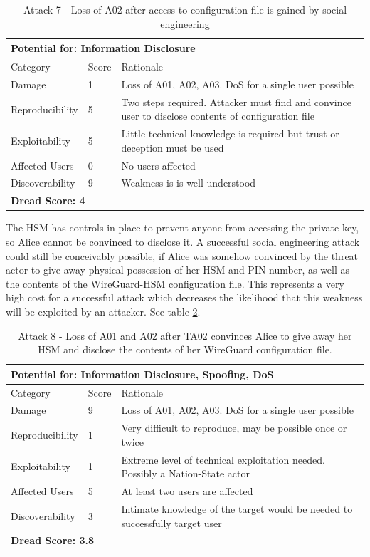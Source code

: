 \documentclass [11pt, proquest] {uwthesis}[2020/02/24]
\begin{document}
\begin{table}[H]
\label{attack7-hsm}
\begin{tabular}{|m{3cm}|m{.9cm}|p{27em} |}
\multicolumn{3}{l}{Potential for: Information Disclosure}                   \\
\hline
Category & Score & Rationale \\
\hline
Damage          & 1     & Loss of A01, A02, A03. DoS for a single user possible            \\
\hline
Reproducibility & 5     & Two steps required. Attacker must find and convince user to disclose contents of configuration file    \\
\hline
Exploitability & 5      & Little technical knowledge is required but trust or deception must be used   \\
\hline
Affected Users  & 0     &  No users affected                     \\
\hline
Discoverability & 9     & Weakness is is well understood  \\
\hline
\multicolumn{3}{l}{\textbf{Dread Score: 4}} 
\end{tabular}
\caption{Attack 7 - Loss of A02 after access to configuration file is gained by social engineering}
\end{table}

The HSM has controls in place to prevent anyone from accessing the private key, so Alice cannot be convinced to disclose it.
A successful social engineering attack could still be conceivably possible, if Alice was somehow convinced by the threat actor to give away physical possession of her HSM and PIN number, as well as the contents of the WireGuard-HSM configuration file. This represents a very high cost for a successful attack which decreases the likelihood that this weakness will be exploited by an attacker. 
See table \ref{attack8-hsm}.


\begin{table}[H]
\label{attack8-hsm}
\begin{tabular}{|m{3cm}|m{.9cm}|p{27em} |}
\multicolumn{3}{l}{Potential for: Information Disclosure, Spoofing, DoS}                   \\
\hline
Category & Score & Rationale \\
\hline
Damage          & 9     & Loss of A01, A02, A03. DoS for a single user possible            \\
\hline
Reproducibility & 1     & Very difficult to reproduce, may be possible once or twice  \\
\hline
Exploitability & 1      & Extreme level of technical exploitation needed. Possibly a Nation-State actor  \\
\hline
Affected Users  & 5     & At least two users are affected                      \\
\hline
Discoverability & 3     & Intimate knowledge of the target would be needed to successfully target user \\
\hline
\multicolumn{3}{l}{\textbf{Dread Score: 3.8}} 
\end{tabular}
\caption{Attack 8 - Loss of A01 and A02 after TA02 convinces Alice to give away her HSM and disclose the contents of her WireGuard configuration file. }
\end{table}
\end{document}
